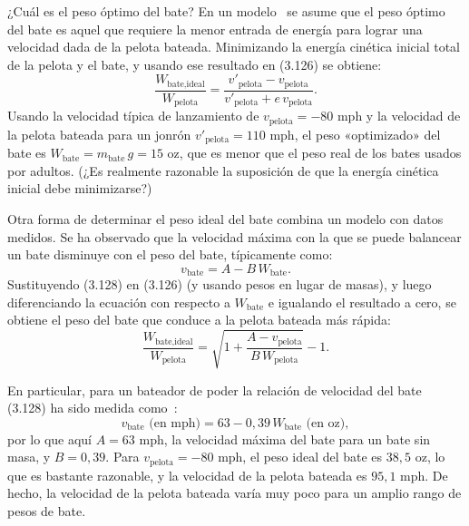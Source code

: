 \documentclass[12pt]{book}
\begin{document}
¿Cuál es el peso óptimo del bate? En un modelo~\cite{ref10,ref80,ref107,ref137} se asume que el peso óptimo del bate es aquel que requiere la menor entrada de energía para lograr una velocidad dada de la pelota bateada. Minimizando la energía cinética inicial total de la pelota y el bate, y usando ese resultado en (3.126) se obtiene:
\begin{equation}
\frac{W_{\text{bate,ideal}}}{W_{\text{pelota}}} = \frac{v'_{\text{pelota}} - v_{\text{pelota}}}{v'_{\text{pelota}} + e\,v_{\text{pelota}}}.
\label{eq:3.127}
\end{equation}
Usando la velocidad típica de lanzamiento de $v_{\text{pelota}} = -80\text{ mph}$ y la velocidad de la pelota bateada para un jonrón $v'_{\text{pelota}} = 110\text{ mph}$, el peso «optimizado» del bate es $W_{\text{bate}} = m_{\text{bate}}\,g = 15\text{ oz}$, que es menor que el peso real de los bates usados por adultos. (¿Es realmente razonable la suposición de que la energía cinética inicial debe minimizarse?)

Otra forma de determinar el peso ideal del bate combina un modelo con datos medidos. Se ha observado que la velocidad máxima con la que se puede balancear un bate disminuye con el peso del bate, típicamente como:
\begin{equation}
v_{\text{bate}} = A - B\,W_{\text{bate}}.
\label{eq:3.128}
\end{equation}
Sustituyendo (3.128) en (3.126) (y usando pesos en lugar de masas), y luego diferenciando la ecuación con respecto a $W_{\text{bate}}$ e igualando el resultado a cero, se obtiene el peso del bate que conduce a la pelota bateada más rápida:
\begin{equation}
\frac{W_{\text{bate,ideal}}}{W_{\text{pelota}}} = \sqrt{1 + \frac{A - v_{\text{pelota}}}{B\,W_{\text{pelota}}}} - 1.
\label{eq:3.129}
\end{equation}

En particular, para un bateador de poder la relación de velocidad del bate (3.128) ha sido medida como~\cite{ref10,ref137}:
\begin{equation}
v_{\text{bate}}\text{ (en mph)} = 63 - 0{,}39\,W_{\text{bate}}\text{ (en oz)},
\label{eq:3.130}
\end{equation}
por lo que aquí $A = 63\text{ mph}$, la velocidad máxima del bate para un bate sin masa, y $B = 0{,}39$. Para $v_{\text{pelota}} = -80\text{ mph}$, el peso ideal del bate es $38{,}5\text{ oz}$, lo que es bastante razonable, y la velocidad de la pelota bateada es $95{,}1\text{ mph}$. De hecho, la velocidad de la pelota bateada varía muy poco para un amplio rango de pesos de bate.
\end{document}
